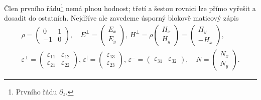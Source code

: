 Člen prvního řádu\footnote{Prvního řádu $\partial_z$.} nemá plnou hodnost; třetí a šestou rovnici lze přímo vyřešit a dosadit do ostatních.
Nejdříve ale zavedeme úsporný blokově maticový zápis
\begin{align}
\label{eqn:Berreman-blokove-znaceni}
    \rho = \begin{pmatrix}0 & 1 \\ -1 & 0\end{pmatrix}
    , \quad E^\perp = \begin{pmatrix}E_x \\ E_y\end{pmatrix}
    , \, H^\perp = \rho \begin{pmatrix} H_x \\ H_y\end{pmatrix} = \begin{pmatrix} H_y \\ -H_x \end{pmatrix}
    , \\ \varepsilon^\perp=\begin{pmatrix}\varepsilon_{11} & \varepsilon_{12} \\ \varepsilon_{21} & \varepsilon_{22}\end{pmatrix}
    , \, \varepsilon^\vert=\begin{pmatrix} \varepsilon_{13} \\ \varepsilon_{23} \end{pmatrix}
    , \, \varepsilon^-=\begin{pmatrix} \varepsilon_{31} & \varepsilon_{32} \end{pmatrix}
    , \quad N = \begin{pmatrix} N_x \\ N_y \end{pmatrix}
    .
\end{align}

